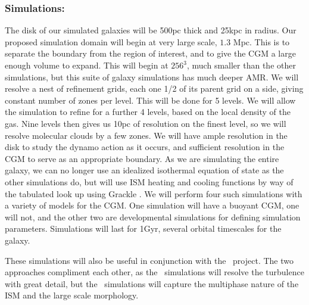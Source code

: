 \subsubsection{Simulations: \nameGalaxies}
\label{subsec.galaxies_sims}

The disk of our simulated galaxies will be 500pc thick and 25kpc in radius.  Our
proposed simulation domain will begin at very large scale, $1.3$ Mpc.  This is to
separate the boundary from the region of interest, and to give the CGM a large
enough volume to expand.  This will begin at $256^3$, much smaller than the
other simulations, but this suite of galaxy simulations has much deeper AMR.  We will resolve a nest of refinement grids, each one
1/2 of its parent grid on a side, giving constant number of zones per level.
This will be done for 5 levels.  We will allow the simulation to 
refine for a further 4 levels, based on the local density of the gas.  Nine
levels then gives us 10pc of resolution on the finest
level, so we will resolve molecular clouds by a few zones.  We will have ample
resolution in the disk to study the dynamo action as it occurs, and sufficient
resolution in the CGM to serve as an appropriate boundary.  As we are simulating
the entire galaxy, we can no longer use an idealized isothermal equation of
state as the other simulations do, but will use ISM heating and cooling functions by way of the
tabulated look up using Grackle \citep{Smith17}.  We will perform four such simulations with a variety of models
for the CGM.  One simulation will have a buoyant CGM, one will not, and the
other two are developmental simulations for defining simulation parameters.
Simulations will last for 1Gyr, several orbital timescales for the galaxy.  

These simulations will also be useful in conjunction with the \nameCMB\ project.
The two approaches compliment each other, as the \nameCMB\ simulations will
resolve the turbulence with great detail, but the \nameGalaxies\ simulations
will capture the multiphase nature of the ISM and the large scale morphology.
